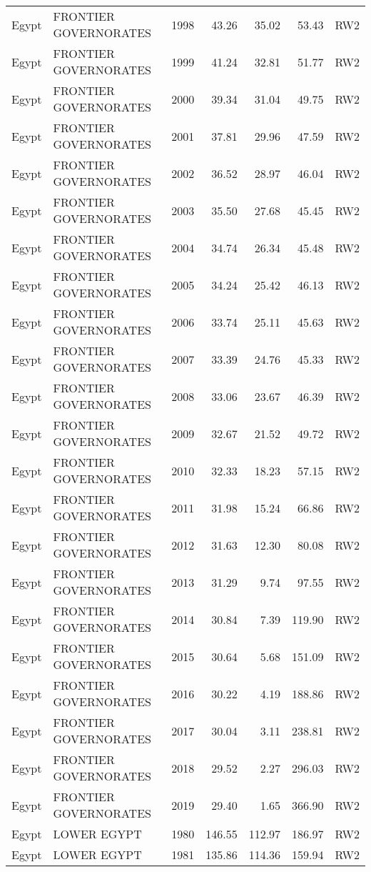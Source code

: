 \begin{longtable}{lllrrrl}
  Egypt & FRONTIER GOVERNORATES & 1998 & 43.26 & 35.02 & 53.43 & RW2 \\ 
  Egypt & FRONTIER GOVERNORATES & 1999 & 41.24 & 32.81 & 51.77 & RW2 \\ 
  Egypt & FRONTIER GOVERNORATES & 2000 & 39.34 & 31.04 & 49.75 & RW2 \\ 
  Egypt & FRONTIER GOVERNORATES & 2001 & 37.81 & 29.96 & 47.59 & RW2 \\ 
  Egypt & FRONTIER GOVERNORATES & 2002 & 36.52 & 28.97 & 46.04 & RW2 \\ 
  Egypt & FRONTIER GOVERNORATES & 2003 & 35.50 & 27.68 & 45.45 & RW2 \\ 
  Egypt & FRONTIER GOVERNORATES & 2004 & 34.74 & 26.34 & 45.48 & RW2 \\ 
  Egypt & FRONTIER GOVERNORATES & 2005 & 34.24 & 25.42 & 46.13 & RW2 \\ 
  Egypt & FRONTIER GOVERNORATES & 2006 & 33.74 & 25.11 & 45.63 & RW2 \\ 
  Egypt & FRONTIER GOVERNORATES & 2007 & 33.39 & 24.76 & 45.33 & RW2 \\ 
  Egypt & FRONTIER GOVERNORATES & 2008 & 33.06 & 23.67 & 46.39 & RW2 \\ 
  Egypt & FRONTIER GOVERNORATES & 2009 & 32.67 & 21.52 & 49.72 & RW2 \\ 
  Egypt & FRONTIER GOVERNORATES & 2010 & 32.33 & 18.23 & 57.15 & RW2 \\ 
  Egypt & FRONTIER GOVERNORATES & 2011 & 31.98 & 15.24 & 66.86 & RW2 \\ 
  Egypt & FRONTIER GOVERNORATES & 2012 & 31.63 & 12.30 & 80.08 & RW2 \\ 
  Egypt & FRONTIER GOVERNORATES & 2013 & 31.29 & 9.74 & 97.55 & RW2 \\ 
  Egypt & FRONTIER GOVERNORATES & 2014 & 30.84 & 7.39 & 119.90 & RW2 \\ 
  Egypt & FRONTIER GOVERNORATES & 2015 & 30.64 & 5.68 & 151.09 & RW2 \\ 
  Egypt & FRONTIER GOVERNORATES & 2016 & 30.22 & 4.19 & 188.86 & RW2 \\ 
  Egypt & FRONTIER GOVERNORATES & 2017 & 30.04 & 3.11 & 238.81 & RW2 \\ 
  Egypt & FRONTIER GOVERNORATES & 2018 & 29.52 & 2.27 & 296.03 & RW2 \\ 
  Egypt & FRONTIER GOVERNORATES & 2019 & 29.40 & 1.65 & 366.90 & RW2 \\ 
  Egypt & LOWER EGYPT & 1980 & 146.55 & 112.97 & 186.97 & RW2 \\ 
  Egypt & LOWER EGYPT & 1981 & 135.86 & 114.36 & 159.94 & RW2 \\ 

\end{longtable}
